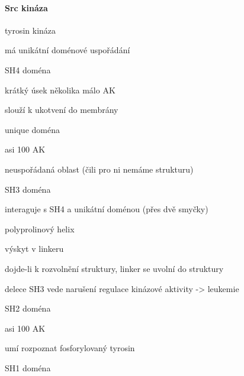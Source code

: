 \documentclass[DIV=8]{scrreprt}
\begin{document}
\paragraph{Src kináza}
\begin{myItemize}[nosep]
    \item tyrosin kináza
    \item má unikátní doménové uspořádání
    \item SH4 doména
\begin{myItemize}[nosep]
    \item krátký úsek několika málo AK
    \item slouží k ukotvení do membrány
\end{myItemize}

    \item unique doména
\begin{myItemize}[nosep]
    \item asi 100 AK
    \item neuspořádaná oblast (čili pro ni nemáme strukturu)
\end{myItemize}

    \item SH3 doména
\begin{myItemize}[nosep]
    \item interaguje s SH4 a unikátní doménou (přes dvě smyčky)
    \item polyprolinový helix
\begin{myItemize}[nosep]
    \item výskyt v linkeru
    \item dojde-li k rozvolnění struktury, linker se uvolní do struktury
\end{myItemize}

    \item delece SH3 vede  narušení regulace kinázové aktivity -> leukemie
\end{myItemize}

    \item SH2 doména
\begin{myItemize}[nosep]
    \item asi 100 AK
    \item umí rozpoznat fosforylovaný tyrosin
\end{myItemize}

    \item SH1 doména
\end{myItemize}
\end{document}
